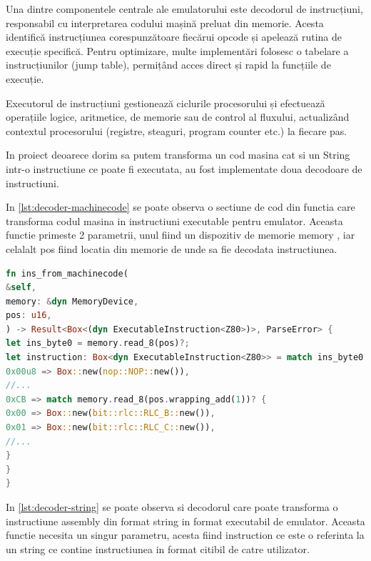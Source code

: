 \documentclass[titlepage,12pt]{article}
\DeclareRobustCommand{\code}[1]{{\ttfamily\small #1}}
\begin{document}
Una dintre componentele centrale ale emulatorului este decodorul de instrucțiuni, responsabil cu interpretarea codului mașină preluat din memorie. Acesta identifică instrucțiunea corespunzătoare fiecărui opcode și apelează rutina de execuție specifică. Pentru optimizare, multe implementări folosesc o tabelare a instrucțiunilor (jump table), permițând acces direct și rapid la funcțiile de execuție.

Executorul de instrucțiuni gestionează ciclurile procesorului și efectuează operațiile logice, aritmetice, de memorie sau de control al fluxului, actualizând contextul procesorului (registre, steaguri, program counter etc.) la fiecare pas.

In proiect deoarece dorim sa putem transforma un cod masina cat si un String intr-o instructiune ce poate fi executata, au fost implementate doua decodoare de instructiuni.

In \cref{lst:decoder-machinecode} se poate observa o sectiune de cod din functia care transforma codul masina in instructiuni executable pentru emulator. Aceasta functie primeste 2 parametrii, unul fiind un dispozitiv de memorie \code{memory} , iar celalalt \code{pos} fiind locatia din memorie de unde sa fie decodata instructiunea.

\begin{lstlisting}[language=Rust,caption={Sectiune decodor din cod masina},label={lst:decoder-machinecode}]
fn ins_from_machinecode(
&self,
memory: &dyn MemoryDevice,
pos: u16,
) -> Result<Box<(dyn ExecutableInstruction<Z80>)>, ParseError> {
let ins_byte0 = memory.read_8(pos)?;
let instruction: Box<dyn ExecutableInstruction<Z80>> = match ins_byte0 {
0x00u8 => Box::new(nop::NOP::new()),
//...
0xCB => match memory.read_8(pos.wrapping_add(1))? {
0x00 => Box::new(bit::rlc::RLC_B::new()),
0x01 => Box::new(bit::rlc::RLC_C::new()),
//...
}
}
}
\end{lstlisting}

In \cref{lst:decoder-string} se poate observa si decodorul care poate transforma o instructiune assembly din format \code{string} in format executabil de emulator. Aceasta functie necesita un singur parametru, acesta fiind \code{instruction} ce este o referinta la un \code{string} ce contine instructiunea in format citibil de catre utilizator.
\end{document}
